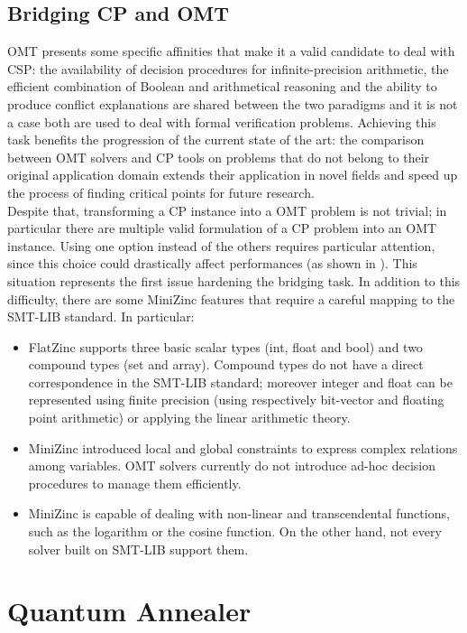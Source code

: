 \subsection{Bridging CP and OMT}

OMT presents some specific affinities that make it a valid candidate to deal with CSP: the availability of decision procedures for infinite-precision arithmetic, the efficient combination of
Boolean and arithmetical reasoning and the ability to produce conflict explanations are shared between the two paradigms and it is not a case both are used to deal with formal verification problems. Achieving this task benefits the progression of the current state of the art: the comparison between OMT solvers and CP tools on problems that do not belong to their original application domain extends their application in novel fields and speed up the process of finding critical points for future research. \\ 
Despite that, transforming a CP instance into a OMT problem is not trivial; in particular there are multiple valid formulation of a CP problem into an OMT instance. Using one option instead of the others requires particular attention, since this choice could drastically affect performances (as shown in \cite{cp2omt}). This situation represents the first issue hardening the bridging task. In addition to this difficulty, there are some MiniZinc features that require a careful mapping to the SMT-LIB standard. In particular:

\begin{itemize}
    \item FlatZinc supports three basic scalar types (int, float and bool) and two compound types (set and array). Compound types do not have a direct correspondence in the SMT-LIB standard; moreover integer and float can be represented using finite precision (using respectively bit-vector and floating point arithmetic) or applying the linear arithmetic theory.
    \item MiniZinc introduced local and global constraints to express complex relations among variables. OMT solvers currently do not introduce ad-hoc decision procedures to manage them efficiently.
    \item MiniZinc is capable of dealing with non-linear and transcendental functions, such as the logarithm or the cosine function. On the other hand, not every solver built on SMT-LIB support them.
\end{itemize}

\section{Quantum Annealer}
\label{sec:quantum}

